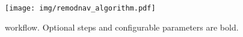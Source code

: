 %

\begin{figure}
    \texttt{[image: img/remodnav\_algorithm.pdf]}
    \caption{\remodnav workflow. Optional steps and configurable parameters are bold.}
    \label{fig:alg}
\end{figure}

